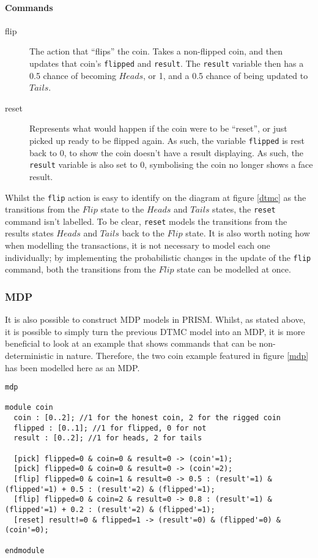 \documentclass{l4proj}
\begin{document}
\paragraph{Commands}
\begin{description}
\item[flip] The action that ``flips'' the coin. Takes a non-flipped coin, and then updates that coin's {\tt flipped} and {\tt result}. The {\tt result} variable then has a 0.5 chance of becoming $Heads$, or 1, and a 0.5 chance of being updated to $Tails$.
\item[reset] Represents what would happen if the coin were to be ``reset'', or just picked up ready to be flipped again. As such, the variable {\tt flipped} is rest back to 0, to show the coin doesn't have a result displaying. As such, the {\tt result} variable is also set to 0, symbolising the coin no longer shows a face result.
\end{description}

Whilst the {\tt flip} action is easy to identify on the diagram at figure \ref{dtmc} as the transitions from the $Flip$ state to the $Heads$ and $Tails$ states, the {\tt reset} command isn't labelled. To be clear, {\tt reset} models the transitions from the results states $Heads$ and $Tails$ back to the $Flip$ state. It is also worth noting how when modelling the transactions, it is not necessary to model each one individually; by implementing the probabilistic changes in the update of the {\tt flip} command, both the transitions from the $Flip$ state can be modelled at once. 

\subsubsection{MDP}

It is also possible to construct MDP models in PRISM. Whilst, as stated above, it is possible to simply turn the previous DTMC model into an MDP, it is more beneficial to look at an example that shows commands that can be non-deterministic in nature. Therefore, the two coin example featured in figure \ref{mdp} has been modelled here as an MDP.

\begin{verbatim}
mdp

module coin
  coin : [0..2]; //1 for the honest coin, 2 for the rigged coin
  flipped : [0..1]; //1 for flipped, 0 for not
  result : [0..2]; //1 for heads, 2 for tails

  [pick] flipped=0 & coin=0 & result=0 -> (coin'=1);
  [pick] flipped=0 & coin=0 & result=0 -> (coin'=2);
  [flip] flipped=0 & coin=1 & result=0 -> 0.5 : (result'=1) & (flipped'=1) + 0.5 : (result'=2) & (flipped'=1);
  [flip] flipped=0 & coin=2 & result=0 -> 0.8 : (result'=1) & (flipped'=1) + 0.2 : (result'=2) & (flipped'=1);
  [reset] result!=0 & flipped=1 -> (result'=0) & (flipped'=0) & (coin'=0);
	
endmodule
\end{verbatim}
\end{document}

